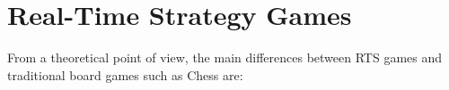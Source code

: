 \documentclass{llncs}
\begin{document}





\section*{Real-Time Strategy Games}\label{sec:rts}

From a  theoretical point  of view, the  main differences  between RTS
games and traditional board games such as Chess are:
\end{document}
